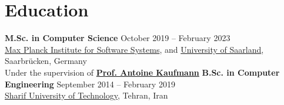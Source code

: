 \documentclass[../main.tex]{subfiles}
\begin{document}
\section{Education}
\begin{category}
    \citembullet \textbf{M.Sc. in Computer Science} \hfill October 2019 -- February 2023\\
    \href{https://mpi-sws.org}{Max Planck Institute for Software Systems}, and 
    \href{https://www.uni-saarland.de/start.html}{University of Saarland}, Saarbrücken, Germany \\
    Under the supervision of \href{https://people.mpi-sws.org/~antoinek/}{\textbf{Prof. Antoine Kaufmann}}
    \citembullet \textbf{B.Sc. in Computer Engineering} \hfill September 2014 -- February 2019 \\
    \href{http://www.en.sharif.edu/}{Sharif University of Technology}, Tehran, Iran 
\end{category}
\end{document}

